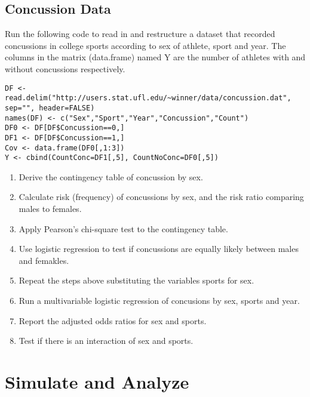 \documentclass[11pt]{article}
\begin{document}
\subsection{Concussion Data}

Run the following code to read in and restructure a dataset that recorded concussions in college sports according to sex of athlete, sport and year. The columns in the matrix (data.frame) named Y are the number of athletes with and without concussions respectively.

\vspace{3mm}
\begin{spacing}{.25}
\begin{lstlisting}
DF <- read.delim("http://users.stat.ufl.edu/~winner/data/concussion.dat", sep="", header=FALSE)
names(DF) <- c("Sex","Sport","Year","Concussion","Count")
DF0 <- DF[DF$Concussion==0,]
DF1 <- DF[DF$Concussion==1,]
Cov <- data.frame(DF0[,1:3])
Y <- cbind(CountConc=DF1[,5], CountNoConc=DF0[,5])
\end{lstlisting}
\end{spacing}


\begin{enumerate}
\item Derive the contingency table of concussion by sex.
\item Calculate risk (frequency) of concussions by sex, and the risk ratio comparing males to females.
\item Apply Pearson's chi-square test to the contingency table.
\item Use logistic regression to test if concussions are equally likely between males and femakles.
\item Repeat the steps above substituting the variables sports for sex.
\item Run a multivariable logistic regression of concusions by sex, sports and year.
\item Report the adjusted odds ratios for sex and sports.
\item Test if there is an interaction of sex and sports.
\end{enumerate}


\section{Simulate and Analyze}
\end{document}
